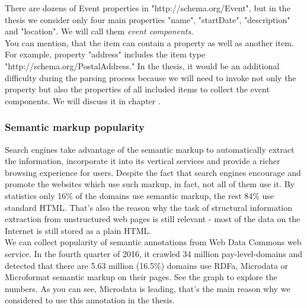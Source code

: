 There are dozens of Event properties in "http://schema.org/Event", but in the thesis we consider only four main properties "name", "startDate", "description" and "location". We will call them \textit{event components}.\\

You can mention, that the item can contain a property as well as another item. For example, property "address" includes the item type "http://schema.org/PostalAddress." In the thesis, it would be an additional difficulty during the parsing process because we will need to invoke not only the property but also the properties of all included items to collect the event components. We will discuss it in chapter . 

\subsubsection*{Semantic markup popularity}

Search engines take advantage of the semantic markup to automatically extract the information, incorporate it into its vertical services and provide a richer browsing experience for users. Despite the fact that search engines encourage and promote the websites which use such markup, in fact, not all of them use it. By statistics only 16\% of the domains use semantic markup, the rest 84\% use standard HTML. That's also the reason why the task of structural information extraction from unstructured web pages is still relevant - most of the data on the Internet is still stored as a plain HTML.\\ 

We can collect popularity of semantic annotations from Web Data Commons web service. In the fourth quarter of 2016, it crawled 34 million pay-level-domains and detected that there are 5.63 million (16.5\%) domains use RDFa, Microdata or Microformat semantic markup on their pages. See the graph  to explore the numbers. As you can see, Microdata is leading, that's the main reason why we considered to use this annotation in the thesis. \\

